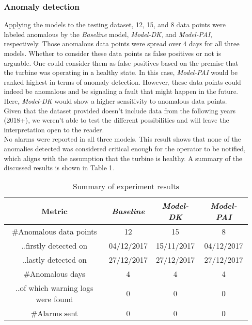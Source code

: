 \subsubsection{Anomaly detection}
Applying the models to the testing dataset, 12, 15, and 8 data points were labeled anomalous by the \emph{Baseline} model,
\emph{Model-DK}, and \emph{Model-PAI}, respectively. Those anomalous data points were spread over 4 days for all three models. 
Whether to consider these data points as false positives or not is 
arguable. One could consider them as false positives based on the premise that the turbine was operating in a healthy state.
In this case, \emph{Model-PAI} would be ranked highest in terms of anomaly detection. However, these data points could indeed
be anomalous and be signaling a fault that might happen in the future. Here, \emph{Model-DK} would show a higher sensitivity 
to anomalous data points. \\
Given that the dataset provided doesn't include data from the following years (2018+), 
we weren't able to test the different possibilities and will leave the interpretation open to the reader.\\

No alarms were reported in all three models. This result shows that none of the anomalies detected was considered 
critical enough for the operator to be notified, which aligns with the assumption that the turbine is healthy.
A summary of the discussed results is shown in Table \ref{tab:summary_expII}.

\begin{table}[H]
    \centering
    \begin{tabular}{|c|c|c|c|}
        \hline
            \textbf{Metric} & \textbf{\emph{Baseline}} & \textbf{\emph{Model-DK}} & \textbf{\emph{Model-PAI}}\\
            \hline
            \#Anomalous data points & 12 & 15 & 8\\
            \hline
            ..firstly detected on & 04/12/2017 & 15/11/2017 & 04/12/2017\\
            \hline
            ..lastly detected on & 27/12/2017 & 27/12/2017 & 27/12/2017\\
            \hline
            \#Anomalous days & 4 & 4 & 4\\
            \hline
            ..of which warning logs were found & 0 & 0 & 0\\
            \hline
            \#Alarms sent & 0 & 0 & 0\\
        \hline
    \end{tabular}
    \caption{Summary of experiment results}
    \label{tab:summary_expII}
\end{table}






